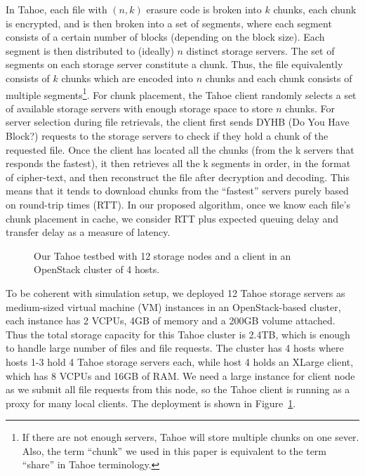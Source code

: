In Tahoe, each file with $(n,k)$ erasure code is broken into $k$ chunks, each chunk is encrypted, and is then broken into a set of segments, where each segment consists of a certain number of blocks (depending on the block size).  Each segment is then distributed to (ideally) $n$ distinct storage servers. The set of segments on each storage server constitute a chunk. Thus, the file equivalently consists of $k$ chunks which are encoded into $n$ chunks and each chunk consists of multiple segments\footnote{If there are not enough servers, Tahoe will store multiple chunks on one sever. Also, the term ``chunk'' we used in this paper is equivalent to the term ``share'' in Tahoe terminology.}. For chunk placement, the Tahoe client randomly selects a set of available storage servers with enough storage space to store $n$ chunks. For server selection during file retrievals, the client first sends DYHB (Do You Have Block?) requests to the storage servers to check if they hold a chunk of the requested file. Once the client has located all the chunks (from the k servers that responds the fastest), it then retrieves all the k segments in order,  in the format of cipher-text, and then  reconstruct the file after decryption and decoding. This means that it tends to download chunks from the ``fastest'' servers purely based on round-trip times (RTT). In our proposed algorithm, once we know each file's chunk placement in cache, we consider RTT plus expected queuing delay and transfer delay as a measure of latency.
\begin{figure}[!thbp]
\vspace{-2mm}
\begin{center}
\vspace{-6mm}
\caption{Our Tahoe testbed with 12 storage nodes and a client in an OpenStack cluster of 4 hosts.}
\label{fig:testbed}
\end{center}
\vspace{-.3in}
\end{figure}

To be coherent with simulation setup, we deployed 12 Tahoe storage servers as medium-sized virtual machine (VM) instances in an OpenStack-based cluster, each instance has 2 VCPUs, 4GB of memory and a 200GB volume attached. Thus the total storage capacity for this Tahoe cluster is 2.4TB, which is enough to handle large number of files and file requests. The cluster has 4 hosts where hosts 1-3 hold 4 Tahoe storage servers each, while host 4 holds an XLarge client, which has 8 VCPUs and 16GB of RAM. We need a large instance for client node as we submit all file requests from this node, so the Tahoe client is running as a proxy for many local clients. The deployment is shown in Figure~\ref{fig:testbed}.

